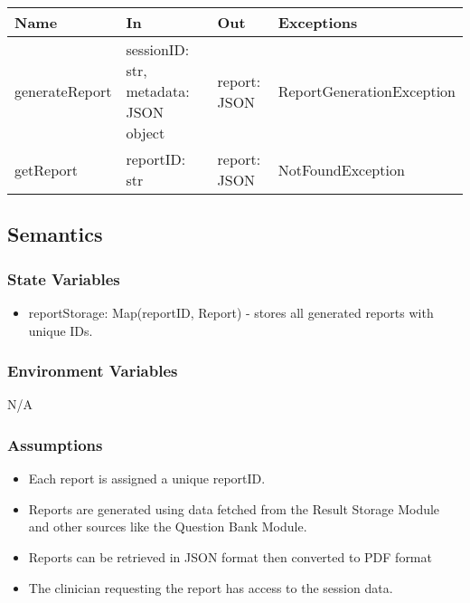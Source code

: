\documentclass[12pt, titlepage]{article}
\begin{document}
\begin{center}
\begin{tabular}{p{3cm} p{4cm} p{4cm} p{5cm}}
\hline
\textbf{Name} & \textbf{In} & \textbf{Out} & \textbf{Exceptions} \\
\hline
generateReport & \raggedright\arraybackslash sessionID: str, metadata: JSON object & \raggedright\arraybackslash report: JSON & \raggedright\arraybackslash ReportGenerationException \\
\hline
getReport & \raggedright\arraybackslash reportID: str & \raggedright\arraybackslash report: JSON & \raggedright\arraybackslash NotFoundException \\
\hline
\end{tabular}
\end{center}

\subsection{Semantics}

\subsubsection{State Variables}

\begin{itemize}
\item reportStorage: Map(reportID, Report) - stores all generated reports with unique IDs.
\end{itemize}

\subsubsection{Environment Variables}

N/A

\subsubsection{Assumptions}

\begin{itemize}
\item Each report is assigned a unique reportID.
\item Reports are generated using data fetched from the Result Storage Module and other sources like the Question Bank Module.
\item Reports can be retrieved in JSON format then converted to PDF format
\item The clinician requesting the report has access to the session data.
\end{itemize}
\end{document}
